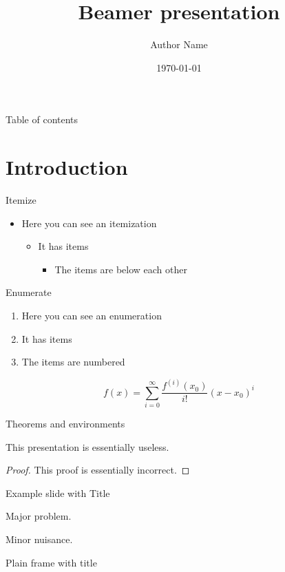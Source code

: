 \documentclass[smaller,professionalfonts]{beamer}
\author{Author Name}
\title{Beamer presentation}
\institute{Pázmány Péter Catholic University}
\date{\today}
\begin{document}
\frame{\maketitle}
\begin{frame}{Table of contents}
	\tableofcontents
\end{frame}

\section{Introduction}
\begin{frame}{Itemize}
\begin{itemize}
\item Here you can see an itemization
\begin{itemize}
\item It has items
\begin{itemize}
\item The items are below each other
\end{itemize}
\end{itemize}
\end{itemize}
\end{frame}

\begin{frame}{Enumerate}
\begin{enumerate}
\item Here you can see an enumeration
\item It has items
\item The items are numbered
\end{enumerate}
\[
	f(x)=\sum_{i=0}^\infty \frac{f^{(i)}(x_0)}{i!}(x-x_0)^i
\]
\end{frame}

\begin{frame}{Theorems and environments}
\begin{theorem}
This presentation is essentially useless.
\end{theorem}
\begin{proof}
This proof is essentially incorrect.
\end{proof}
\end{frame}

\begin{frame}{Example slide with Title}
\begin{example}
Major problem.
\end{example}
\begin{solution}
Minor nuisance.
\end{solution}
\end{frame}

\begin{frame}[plain]{Plain frame with title}
\lipsum[1]
\end{frame}
\end{document}
